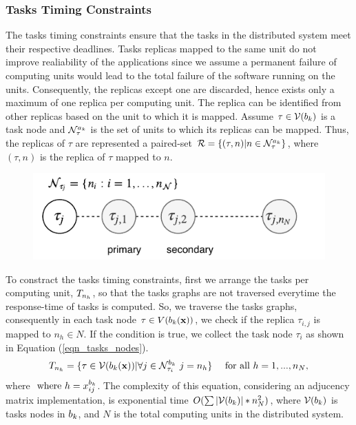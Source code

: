 \subsubsection{Tasks Timing Constraints}
The tasks timing constraints ensure that the tasks in the distributed system meet their respective deadlines. Tasks replicas mapped to the same unit do not improve realiability of the applications since we assume a permanent failure of computing units would lead to the total failure of the software running on the units. Consequently, the replicas except one are discarded, hence exists only a maximum of one replica per computing unit. The replica can be identified from other replicas based on the unit to which it is mapped. Assume $\tau\in \mathcal{V}(b_{k})$ is a task node and $\sss{\mathcal{N}}[k][\tau]$ is the set of units to which its replicas can be mapped. Thus, the replicas of $\tau$ are represented a paired-set $\mathcal{R}=\{(\tau,n)|n\in\sss{\mathcal{N}}[k][\tau]\}$, where $(\tau,n)$ is the replica of $\tau$ mapped to $n$.
\begin{figure}[h!]
	\centering
	\includegraphics[width=0.7\linewidth]{img/task_replicas}
\end{figure}

To constract the tasks timing constraints, first we arrange the tasks per computing unit, $\ssb{T}[n_h]$, so that the tasks graphs are not traversed everytime the response-time of tasks is computed. So, we traverse the tasks graphs, consequently in each task node $\tau\in V(b_{k}(\textbf{x}))$, we check if the replica $\tau_{i,j}$ is mapped to $n_h\in N$. If the condition is true, we collect the task node $\tau_i$ as shown in Equation (\ref{eqn_tasks_nodes}). 
\begin{align}
\label{eqn_tasks_nodes}
T_{n_h}&=\{\tau\in \mathcal{V}(\at(\x)) | \forall j\in\sss{\mathcal{N}}[k][\tau_i][b]\ j=n_h\} & \mbox{ for all } h=1,...,n_N,
\end{align}
where $\mbox{ where }h=x^{b_k}_{ij}$. The complexity of this equation, considering an adjucency matrix implementation, is exponential time $O(\sum{|\mathcal{V}(b_{k})|*n_N^2})$, where $\mathcal{V}(b_{k})$ is tasks nodes in $b_{k}$, and $N$ is the total computing units in the distributed system. 

